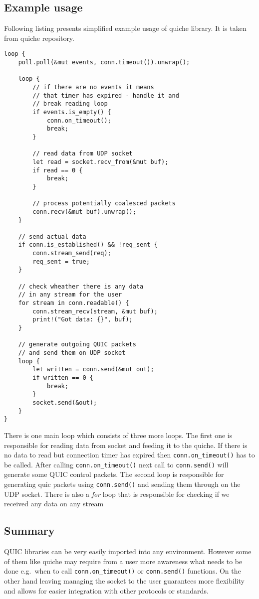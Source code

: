 \FloatBarrier

\subsection{Example usage}
\label{subsec:example-usage}
Following listing presents simplified example usage of quiche library.
It is taken from quiche repository.
\begin{lstlisting}[label={lst:lstlisting2},caption={Simplified example usage of quiche library.},captionpos=b]
loop {
    poll.poll(&mut events, conn.timeout()).unwrap();

    loop {
        // if there are no events it means
        // that timer has expired - handle it and
        // break reading loop
        if events.is_empty() {
            conn.on_timeout();
            break;
        }

        // read data from UDP socket
        let read = socket.recv_from(&mut buf);
        if read == 0 {
            break;
        }

        // process potentially coalesced packets
        conn.recv(&mut buf).unwrap();
    }

    // send actual data
    if conn.is_established() && !req_sent {
        conn.stream_send(req);
        req_sent = true;
    }

    // check wheather there is any data
    // in any stream for the user
    for stream in conn.readable() {
        conn.stream_recv(stream, &mut buf);
        print!("Got data: {}", buf);
    }

    // generate outgoing QUIC packets
    // and send them on UDP socket
    loop {
        let written = conn.send(&mut out);
        if written == 0 {
            break;
        }
        socket.send(&out);
    }
}
\end{lstlisting}

There is one main loop which consists of three more loops.
The first one is responsible for reading data from socket and feeding it to the quiche.
If there is no data to read but connection timer has expired then \lstinline{conn.on_timeout()} has to be called.
After calling \lstinline{conn.on_timeout()} next call to \lstinline{conn.send()} will generate some QUIC control packets.
The second loop is responsible for generating quic packets using \lstinline{conn.send()} and sending them through on
the UDP socket.
There is also a \textit{for} loop that is responsible for checking if we received any data on any stream

\subsection{Summary}
\label{subsec:summary2}
QUIC libraries can be very easily imported into any environment.
However some of them like quiche may require from a user more awareness what needs to be done e.g.\
when to call \lstinline{conn.on_timeout()} or \lstinline{conn.send()} functions.
On the other hand leaving managing the socket to the user guarantees more flexibility and allows for easier integration with
other protocols or standards.

